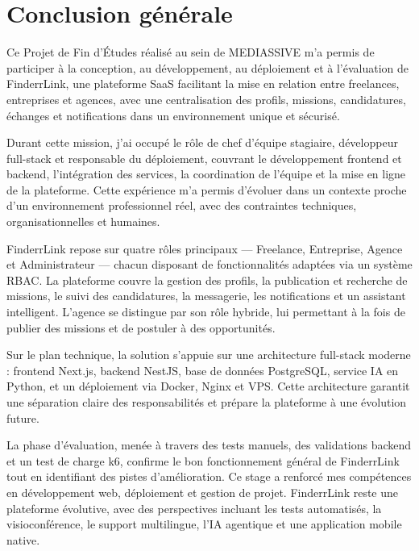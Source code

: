 \chapter*{Conclusion générale}

Ce Projet de Fin d'Études réalisé au sein de MEDIASSIVE m'a permis de participer à la conception, au développement, au déploiement et à l'évaluation de FinderrLink, une plateforme SaaS facilitant la mise en relation entre freelances, entreprises et agences, avec une centralisation des profils, missions, candidatures, échanges et notifications dans un environnement unique et sécurisé.

Durant cette mission, j'ai occupé le rôle de chef d'équipe stagiaire, développeur full-stack et responsable du déploiement, couvrant le développement frontend et backend, l'intégration des services, la coordination de l'équipe et la mise en ligne de la plateforme. Cette expérience m'a permis d'évoluer dans un contexte proche d'un environnement professionnel réel, avec des contraintes techniques, organisationnelles et humaines.

FinderrLink repose sur quatre rôles principaux — Freelance, Entreprise, Agence et Administrateur — chacun disposant de fonctionnalités adaptées via un système RBAC. La plateforme couvre la gestion des profils, la publication et recherche de missions, le suivi des candidatures, la messagerie, les notifications et un assistant intelligent. L'agence se distingue par son rôle hybride, lui permettant à la fois de publier des missions et de postuler à des opportunités.

Sur le plan technique, la solution s'appuie sur une architecture full-stack moderne : frontend Next.js, backend NestJS, base de données PostgreSQL, service IA en Python, et un déploiement via Docker, Nginx et VPS. Cette architecture garantit une séparation claire des responsabilités et prépare la plateforme à une évolution future.

La phase d'évaluation, menée à travers des tests manuels, des validations backend et un test de charge k6, confirme le bon fonctionnement général de FinderrLink tout en identifiant des pistes d'amélioration. Ce stage a renforcé mes compétences en développement web, déploiement et gestion de projet. FinderrLink reste une plateforme évolutive, avec des perspectives incluant les tests automatisés, la visioconférence, le support multilingue, l'IA agentique et une application mobile native.

